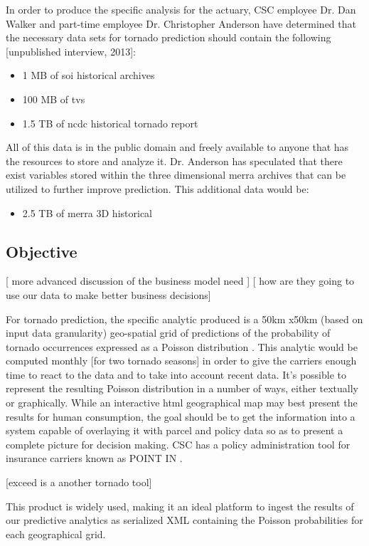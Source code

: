 In order to produce the specific analysis for the actuary, \textsc{CSC} employee Dr. Dan Walker and part-time employee Dr. Christopher Anderson have determined that the necessary data sets for tornado prediction should contain the following [unpublished interview, 2013]:
\begin{itemize}
    \item 1 MB of \gls{soi} historical archives \cite{bom}
    \item 100 MB of \gls{tvs} \cite{hdss}
    \item 1.5 TB of \gls{ncdc} historical tornado report \cite{ncdc}
\end{itemize}
All of this data is in the public domain and freely available to anyone that has the resources to store and analyze it. Dr. Anderson has speculated that there exist variables stored within the three dimensional \gls{merra} archives that can be utilized to further improve prediction. This additional data would be:
\begin{itemize}
    \item 2.5 TB of \gls{merra} 3D historical \cite{mdisc}
\end{itemize}
\subsection{Objective}

[ more advanced discussion of the business model need ]
[ how are they going to use our data to make better business decisions]

For tornado prediction, the specific analytic produced is a 50km x50km (based on input data granularity) geo-spatial grid of predictions of the probability of tornado occurrences expressed as a Poisson distribution \cite{anderson}. This analytic would be computed monthly [for two tornado seasons] in order to give the carriers enough time to react to the data and to take into account recent data. It's possible to represent the resulting Poisson distribution in a number of ways, either textually or graphically. While an interactive \gls{html} geographical map may best present the results for human consumption, the goal should be to get the information into a system capable of overlaying it with parcel and policy data so as to present a complete picture for decision making. \textsc{CSC} has a policy administration tool for insurance carriers known as POINT IN \cite{point_in}.

[exceed is a another tornado tool]

 This product is widely used, making it an ideal platform to ingest the results of our predictive analytics as serialized XML containing the Poisson probabilities for each geographical grid.
